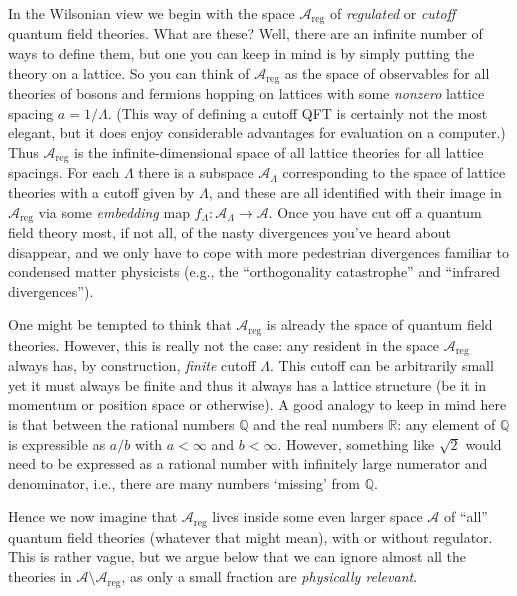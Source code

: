 \documentclass[11pt]{amsart}
\theoremstyle{plain}%
\theoremstyle{definition}
\theoremstyle{remark}
\begin{document}
In the Wilsonian view we begin with the space $\mathcal{A}_{\text{reg}}$ of \emph{regulated} or \emph{cutoff} quantum field theories. What are these? Well, there are an infinite number of ways to define them, but one you can keep in mind is by simply putting the theory on a lattice. So you can think of $\mathcal{A}_{\text{reg}}$ as the space of observables for all theories of bosons and fermions hopping on lattices with some \emph{nonzero} lattice spacing $a = 1/\Lambda$. (This way of defining a cutoff QFT is certainly not the most elegant, but it does enjoy considerable advantages for evaluation on a computer.) Thus $\mathcal{A}_{\text{reg}}$ is the infinite-dimensional space of all lattice theories for all lattice spacings. For each $\Lambda$ there is a subspace $\mathcal{A}_\Lambda$ corresponding to the space of lattice theories with a cutoff given by $\Lambda$, and these are all identified with their image in $\mathcal{A}_{\text{reg}}$ via some \emph{embedding} map $f_\Lambda:\mathcal{A}_\Lambda\rightarrow \mathcal{A}$. Once you have cut off a quantum field theory most, if not all, of the nasty divergences you've heard about disappear, and we only have to cope with more pedestrian divergences familiar to condensed matter physicists (e.g., the ``orthogonality catastrophe'' and ``infrared divergences''). 

One might be tempted to think that $\mathcal{A}_{\text{reg}}$ is already the space of quantum field theories. However, this is really not the case: any resident in the space $\mathcal{A}_{\text{reg}}$ always has, by construction, \emph{finite} cutoff $\Lambda$. This cutoff can be arbitrarily small yet it must always be finite and thus it always has a lattice structure (be it in momentum or position space or otherwise). A good analogy to keep in mind here is that between the rational numbers $\mathbb{Q}$ and the real numbers $\mathbb{R}$: any element of $\mathbb{Q}$ is expressible as $a/b$ with $a<\infty$ and $b < \infty$. However, something like $\sqrt{2}$ would need to be expressed as a rational number with infinitely large numerator and denominator, i.e., there are many numbers `missing' from $\mathbb{Q}$. 

Hence we now imagine that $\mathcal{A}_{\text{reg}}$ lives inside some even larger space $\mathcal{A}$ of ``all'' quantum field theories (whatever that might mean), with or without regulator. This is rather vague, but we argue below that we can ignore almost all the theories in $\mathcal{A}\setminus\mathcal{A}_{\text{reg}}$, as only a small fraction are \emph{physically relevant}.
\end{document}
